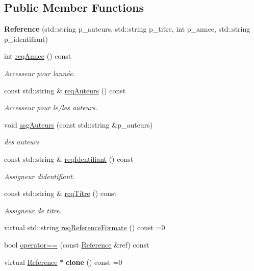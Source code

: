 \subsection*{Public Member Functions}
\begin{DoxyCompactItemize}
\item 
{\bfseries Reference} (std\+::string p\+\_\+auteurs, std\+::string p\+\_\+titre, int p\+\_\+annee, std\+::string p\+\_\+identifiant)\hypertarget{classbiblio_1_1Reference_a9b67b87dbb52b8aed293fff4b8184c5e}{}\label{classbiblio_1_1Reference_a9b67b87dbb52b8aed293fff4b8184c5e}

\item 
int \hyperlink{classbiblio_1_1Reference_acaa3e9f6b56c94a13374de5ce7984d30}{req\+Annee} () const 
\begin{DoxyCompactList}\small\item\em Accesseur pour l\textquotesingle{}année. \end{DoxyCompactList}\item 
const std\+::string \& \hyperlink{classbiblio_1_1Reference_a5ab6c05f95be3beb7591c588413ac6bf}{req\+Auteurs} () const 
\begin{DoxyCompactList}\small\item\em Accesseur pour le/les auteurs. \end{DoxyCompactList}\item 
void \hyperlink{classbiblio_1_1Reference_aee041fbf9b44e02241eb717783a5d8f2}{asg\+Auteurs} (const std\+::string \&p\+\_\+auteurs)
\begin{DoxyCompactList}\small\item\em des auteurs \end{DoxyCompactList}\item 
const std\+::string \& \hyperlink{classbiblio_1_1Reference_a2b00f5c1e762abee52ba30bb3fbfab37}{req\+Identifiant} () const 
\begin{DoxyCompactList}\small\item\em Assigneur d\textquotesingle{}identifiant. \end{DoxyCompactList}\item 
const std\+::string \& \hyperlink{classbiblio_1_1Reference_acc2a2075747a2e26f0d4eaab742f4f31}{req\+Titre} () const 
\begin{DoxyCompactList}\small\item\em Assigneur de titre. \end{DoxyCompactList}\item 
virtual std\+::string \hyperlink{classbiblio_1_1Reference_a6a1a403b66587341f89aca0e9d6c4f7a}{req\+Reference\+Formate} () const =0
\item 
bool \hyperlink{classbiblio_1_1Reference_a48220b30f6704d6f0aca13bf51022375}{operator==} (const \hyperlink{classbiblio_1_1Reference}{Reference} \&ref) const 
\item 
virtual \hyperlink{classbiblio_1_1Reference}{Reference} $\ast$ {\bfseries clone} () const =0\hypertarget{classbiblio_1_1Reference_a912da874b8a5221d8e17aa3118d3116b}{}\label{classbiblio_1_1Reference_a912da874b8a5221d8e17aa3118d3116b}

\end{DoxyCompactItemize}



